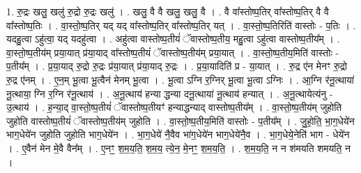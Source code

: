 \documentclass[17pt]{extarticle}
\begin{document}
1. रु॒द्रः खलु॒ खलु॑ रु॒द्रो रु॒द्रः खलु॑ । . खलु॒ वै वै खलु॒ खलु॒ वै । . वै वा᳚स्तोष्प॒तिर् वा᳚स्तोष्प॒तिर् वै वै वा᳚स्तोष्प॒तिः । . वा॒स्तो॒ष्प॒तिर् यद् यद् वा᳚स्तोष्प॒तिर् वा᳚स्तोष्प॒तिर् यत् । . वा॒स्तो॒ष्प॒तिरिति॑ वास्तोः - प॒तिः । . यदहु॒त्वा ऽहु॑त्वा॒ यद् यदहु॑त्वा । . अहु॑त्वा वास्तोष्प॒तीयं॑ ॅवास्तोष्प॒तीय॒ महु॒त्वा ऽहु॑त्वा वास्तोष्प॒तीय᳚म् । . वा॒स्तो॒ष्प॒तीय॑म् प्रया॒यात् प्र॑या॒याद् वा᳚स्तोष्प॒तीयं॑ ॅवास्तोष्प॒तीय॑म् प्रया॒यात् । . वा॒स्तो॒ष्प॒तीय॒मिति॑ वास्तोः - प॒तीय᳚म् । . प्र॒या॒याद् रु॒द्रो रु॒द्रः प्र॑या॒यात् प्र॑या॒याद् रु॒द्रः । . प्र॒या॒यादिति॑ प्र - या॒यात् । . रु॒द्र ए॑न मेनꣳ रु॒द्रो रु॒द्र ए॑नम् । . ए॒न॒म् भू॒त्वा भू॒त्वैन॑ मेनम् भू॒त्वा । . भू॒त्वा ऽग्नि र॒ग्निर् भू॒त्वा भू॒त्वा ऽग्निः । . आ॒ग्नि र॑नू॒त्थाया॑ नू॒त्थाया॒ ग्नि र॒ग्नि र॑नू॒त्थाय॑ । . अ॒नू॒त्थाय॑ हन्या द्धन्या दनू॒त्थाया॑ नू॒त्थाय॑ हन्यात् । . अ॒नू॒त्थायेत्य॑नु - उ॒त्थाय॑ । . ह॒न्या॒द् वा॒स्तो॒ष्प॒तीयं॑ ॅवास्तोष्प॒तीयꣳ॑ हन्याद्धन्याद् वास्तोष्प॒तीय᳚म् । . वा॒स्तो॒ष्प॒तीय॑म् जुहोति जुहोति वास्तोष्प॒तीयं॑ ॅवास्तोष्प॒तीय॑म् जुहोति । . वा॒स्तो॒ष्प॒तीय॒मिति॑ वास्तोः - प॒तीय᳚म् । . जु॒हो॒ति॒ भा॒ग॒धेये॑न भाग॒धेये॑न जुहोति जुहोति भाग॒धेये॑न । . भा॒ग॒धेये॑ नै॒वैव भा॑ग॒धेये॑न भाग॒धेये॑नै॒व । . भा॒ग॒धेये॒नेति॑ भाग - धेये॑न । . ए॒वैन॑ मेन मे॒वै वैन᳚म् । . ए॒नꣳ॒॒ श॒म॒य॒ति॒ श॒म॒य॒ त्ये॒न॒ मे॒नꣳ॒॒ श॒म॒य॒ति॒ । . श॒म॒य॒ति॒ न न श॑मयति शमयति॒ न । \newline
\end{document}
